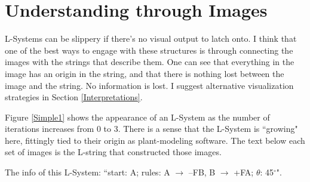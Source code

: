 \documentclass[12pt,twoside]{reedthesis}
\newcommand{\code}[1]{\texttt{#1}}
\begin{document}
\section{Understanding through Images}
\label{Understanding-through-Images}

	L-Systems can be slippery if there's no visual output to latch onto. I think that one of the best ways to engage with these structures is through connecting the images with the strings that describe them. One can see that everything in the image has an origin in the string, and that there is nothing lost between the image and the string. No information is lost. I suggest alternative visualization strategies in Section \ref{Interpretations}.
	
	Figure \ref{Simple1} shows the appearance of an L-System as the number of iterations increases from 0 to 3. There is a sense that the L-System is ``growing" here, fittingly tied to their origin as plant-modeling software. The text below each set of images is the L-string that constructed those images.

	The info of this L-System: ``start: A; rules: A $\rightarrow$ –FB, B $\rightarrow$ +FA; $\theta$: 45$^{\circ}$".

\end{document}
